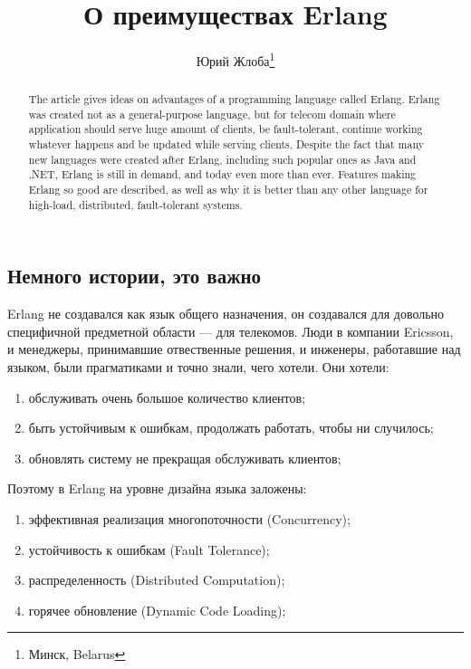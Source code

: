 \documentclass[10pt, a5paper]{article}
\begin{document}
\title{О преимуществах Erlang}%

\author{Юрий Жлоба\footnote{Минск, Belarus}}
\maketitle

\begin{abstract}
The article gives ideas on advantages of a programming language called Erlang.
Erlang was created not as a general-purpose language, but for telecom domain where application should serve huge amount of clients, be fault-tolerant,  continue working whatever happens and be updated while serving clients.
Despite the fact that many new languages were created after Erlang, including such popular ones as Java and .NET, Erlang is still in demand, and today even more than ever.
Features making Erlang so good are described, as well as why it is better than any other language for high-load, distributed, fault-tolerant systems.
\end{abstract}


\subsection*{Немного истории, это важно}

Erlang не создавался как язык общего назначения, он создавался для довольно специфичной предметной области --- для телекомов. Люди в компании Ericsson, и менеджеры, принимавшие отвественные решения, и инженеры, работавшие над языком, были прагматиками и точно знали, чего хотели. Они хотели:

\begin{enumerate}
  \item обслуживать очень большое количество клиентов;
  \item быть устойчивым к ошибкам, продолжать работать, чтобы ни случилось;
  \item обновлять систему не прекращая обслуживать клиентов;
\end{enumerate}

Поэтому в Erlang на уровне дизайна языка заложены:

\begin{enumerate}
  \item эффективная реализация многопоточности (Concurrency);
  \item устойчивость к ошибкам (Fault Tolerance);
  \item распределенность (Distributed Computation);
  \item горячее обновление (Dynamic Code Loading);
\end{enumerate}
\end{document}
